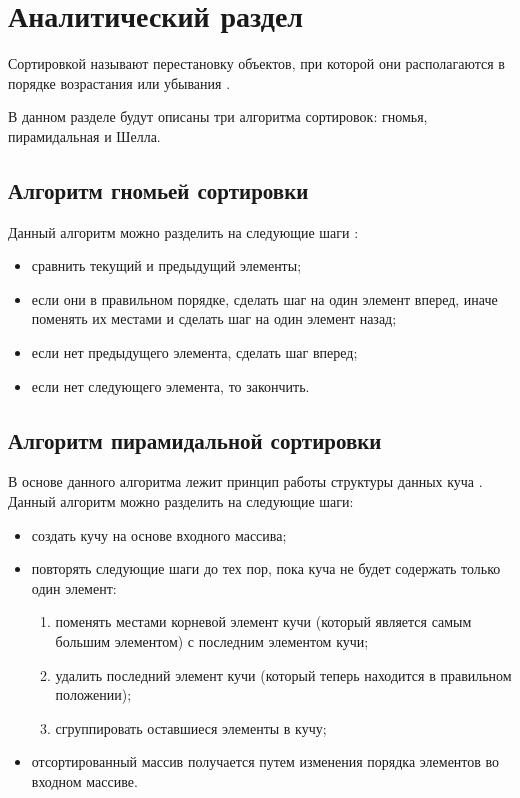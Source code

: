 \chapter{Аналитический раздел}

Сортировкой называют перестановку объектов, при которой они располагаются в порядке возрастания или убывания \cite{knut}.

В данном разделе будут описаны три алгоритма сортировок: гномья, пирамидальная и Шелла.

\section{Алгоритм гномьей сортировки}
Данный алгоритм можно разделить на следующие шаги \cite{gnome}:

\begin{itemize}
	\item сравнить текущий и предыдущий элементы;
	\item если они в правильном порядке, сделать шаг на один элемент вперед, иначе поменять их местами и сделать шаг на один элемент назад;
	\item если нет предыдущего элемента, сделать шаг вперед;
	\item если нет следующего элемента, то закончить.
\end{itemize}


\section{Алгоритм пирамидальной сортировки}

В основе данного алгоритма лежит принцип работы структуры данных куча \cite{heap}.
Данный алгоритм можно разделить на следующие шаги:

\begin{itemize}
	\item создать кучу на основе входного массива;
	\item повторять следующие шаги до тех пор, пока куча не будет содержать только один элемент:
	\begin{enumerate}
		\item поменять местами корневой элемент кучи (который является самым большим элементом) с последним элементом кучи;
		\item удалить последний элемент кучи (который теперь находится в правильном положении);
		\item сгруппировать оставшиеся элементы в кучу;
	\end{enumerate}
	\item отсортированный массив получается путем изменения порядка элементов во входном массиве.
\end{itemize}



